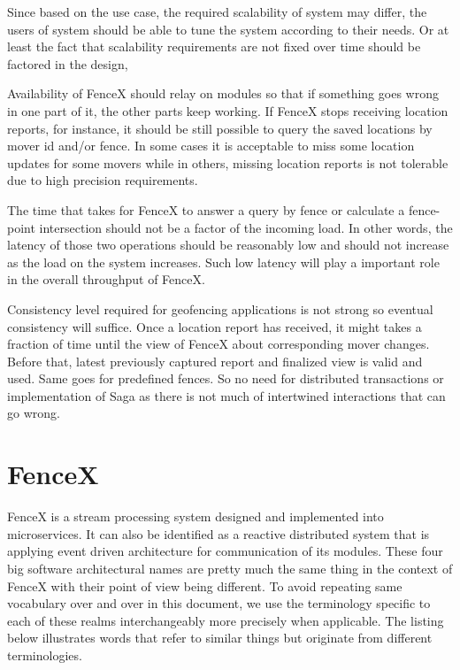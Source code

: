 \documentclass[a4]{report}
\begin{document}
    Since based on the use case, the required scalability of system may differ, the users of system should be able to
    tune the system according to their needs.
    Or at least the fact that scalability requirements are not fixed over time should be factored in the design,

    Availability of FenceX should relay on modules so that if something goes wrong in one part of it, the other parts
    keep working.
    If FenceX stops receiving location reports, for instance, it should be still possible to query the saved
    locations by mover id and/or fence.
    In some cases it is acceptable to miss some location updates for some movers while in others, missing location
    reports is not tolerable due to high precision requirements.

    The time that takes for FenceX to answer a query by fence or calculate a fence-point intersection should not be a
    factor of the incoming load.
    In other words, the latency of those two operations should be reasonably low and should not increase as the load
    on the system increases.
    Such low latency will play a important role in the overall throughput of FenceX.

    Consistency level required for geofencing applications is not strong so eventual consistency will suffice.
    Once a location report has received, it might takes a fraction of time until the view of FenceX about
    corresponding mover changes.
    Before that, latest previously captured report and finalized view is valid and used.
    Same goes for predefined fences.
    So no need for distributed transactions or implementation of Saga as there is not much of intertwined
    interactions that can go wrong.

    \chapter{FenceX}
    FenceX is a stream processing system designed and implemented into microservices.
    It can also be identified as a reactive distributed system that is applying event driven architecture for
    communication of its modules.
    These four big software architectural names are pretty much the same thing in the context of FenceX with their
    point of view being different.
    To avoid repeating same vocabulary over and over in this document, we use the terminology specific to each of
    these realms interchangeably more precisely when applicable.
    The listing below illustrates words that refer to similar things but originate from different terminologies.
\end{document}
